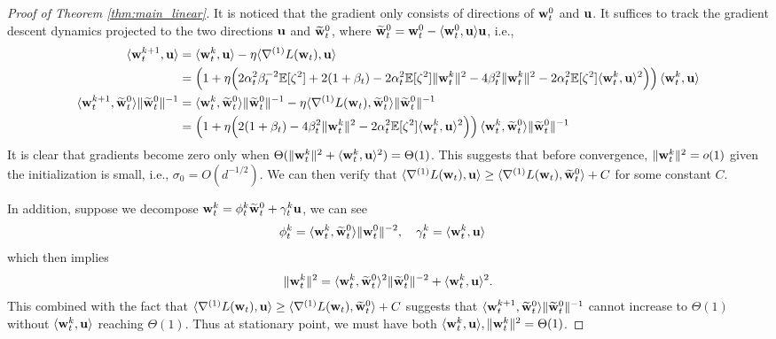 \begin{proof}[Proof of Theorem \ref{thm:main_linear}]
It is noticed that the gradient only consists of directions of ${\mathbf w}_t^0$ and ${\mathbf u}$. It suffices to track the gradient descent dynamics projected to the two directions ${\mathbf u}$ and $ \widetilde {{\mathbf w}}_{t}^0$, where $\widetilde {{\mathbf w}}_t^0 = {\mathbf w}_t^0 - \langle {\mathbf w}_t^0, {\mathbf u} \rangle {\mathbf u}$, i.e.,
\begin{align*}
    \langle {\mathbf w}_{t}^{k+1}, {\mathbf u} \rangle  &= \langle {\mathbf w}_{t}^{k}, {\mathbf u} \rangle - \eta \langle \nabla^{(1)} L({\mathbf w}_t), {\mathbf u} \rangle  \\
    &= \left(1  + \eta \Big( 2 \alpha_t^2 \beta_t^{-2} {\mathbb{E}}[\zeta^2] + 2(1 + \beta_t) - 2 \alpha_t^2{\mathbb{E}}[\zeta^2] \| {\mathbf w}_t^k \|^2 - 4 \beta_t^2 \| {\mathbf w}_t^k \|^2 - 2 \alpha_t^2 {\mathbb{E}}[\zeta^2] \langle {\mathbf w}_t^k, {\mathbf u}\rangle^2 \Big) \right) \langle {\mathbf w}_t^k, {\mathbf u} \rangle \\
    \langle {\mathbf w}_{t}^{k+1}, \widetilde {{\mathbf w}}_t^0 \rangle \| \widetilde{{\mathbf w}}_t^0\|^{-1}  &= \langle {\mathbf w}_{t}^{k}, \widetilde{{\mathbf w}}_t^0 \rangle \| \widetilde{{\mathbf w}}_t^0\|^{-1} - \eta \langle \nabla^{(1)} L({\mathbf w}_t), \widetilde {{\mathbf w}}_t^0 \rangle \| \widetilde{{\mathbf w}}_t^0\|^{-1} \\
    &=\left( 1  + \eta \Big( 2 (1+ \beta_t ) - 4 \beta_t^2 \| {\mathbf w}_t^k \|^2 - 2 \alpha_t^2 {\mathbb{E}}[\zeta^2] \langle {\mathbf w}_t^k, {\mathbf u} \rangle^2  \Big) \right) \langle {\mathbf w}_t^k, \widetilde {{\mathbf w}}_t^0 \rangle \| \widetilde{{\mathbf w}}_t^0\|^{-1} 
\end{align*}
It is clear that gradients become zero only when $\Theta(\| {\mathbf w}_{t}^k\|^2 + \langle {\mathbf w}_t^k, {\mathbf u} \rangle^2) = \Theta(1)$. This suggests that before convergence, $\| {\mathbf w}_t^k \|^2 = o(1)$ given the initialization is small, i.e., $\sigma_0 = O(d^{-1/2})$. We can then verify that $\langle \nabla^{(1)} L({\mathbf w}_t), {\mathbf u} \rangle \geq \langle \nabla^{(1)} L({\mathbf w}_t), \widetilde {{\mathbf w}}_t^0 \rangle + C$ for some constant $C$. 

In addition, suppose we decompose ${\mathbf w}_{t}^k = \phi_t^k \widetilde {{\mathbf w}}_t^0 + \gamma_t^k {\mathbf u}$, we can see 
\begin{align*}
    &\phi_t^k = \langle {\mathbf w}_t^k,  \widetilde {{\mathbf w}}_t^0 \rangle \| {\mathbf w}_t^0 \|^{-2}, \quad \gamma_t^k = \langle {\mathbf w}_t^k, {\mathbf u} \rangle
\end{align*}
which then implies 
\begin{align*}
    \| {\mathbf w}_t^k \|^2 = \langle {\mathbf w}_t^k, \widetilde {{\mathbf w}}_t^0 \rangle^2 \| \widetilde {{\mathbf w}}_t^0 \|^{-2} + \langle {\mathbf w}_t^k, {\mathbf u} \rangle^2.
\end{align*}
This combined with the fact that $\langle \nabla^{(1)} L({\mathbf w}_t), {\mathbf u} \rangle \geq \langle \nabla^{(1)} L({\mathbf w}_t), \widetilde {{\mathbf w}}_t^0 \rangle + C$ suggests that $\langle {\mathbf w}_{t}^{k+1}, \widetilde {{\mathbf w}}_t^0 \rangle \| \widetilde{{\mathbf w}}_t^0\|^{-1}$ cannot increase to $\Theta(1)$ without $\langle {\mathbf w}_t^k, {\mathbf u} \rangle$ reaching $\Theta(1)$. Thus at stationary point, we must have both $\langle {\mathbf w}_t^k, {\mathbf u} \rangle, \| {\mathbf w}_t^k\|^2 = \Theta(1)$.



\end{proof}
